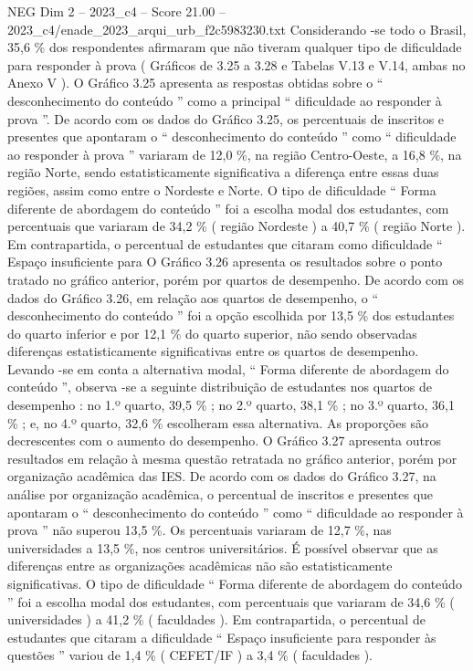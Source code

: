 \begin{textsample}{NEG Dim 2 – 2023\_c4 – Score 21.00 – 2023\_c4/enade\_2023\_arqui\_urb\_f2c5983230.txt}
Considerando -se todo o Brasil, 35,6 \% dos respondentes afirmaram que não tiveram qualquer tipo de dificuldade para responder à prova ( Gráficos de 3.25 a 3.28 e Tabelas V.13 e V.14, ambas no Anexo V ).
O Gráfico 3.25 apresenta as respostas obtidas sobre o “ desconhecimento do conteúdo ” como a principal “ dificuldade ao responder à prova ”.
De acordo com os dados do Gráfico 3.25, os percentuais de inscritos e presentes que apontaram o “ desconhecimento do conteúdo ” como “ dificuldade ao responder à prova ” variaram de 12,0 \%, na região Centro-Oeste, a 16,8 \%, na região Norte, sendo estatisticamente significativa a diferença entre essas duas regiões, assim como entre o Nordeste e Norte.
O tipo de dificuldade “ Forma diferente de abordagem do conteúdo ” foi a escolha modal dos estudantes, com percentuais que variaram de 34,2 \% ( região Nordeste ) a 40,7 \% ( região Norte ).
Em contrapartida, o percentual de estudantes que citaram como dificuldade “ Espaço insuficiente para O Gráfico 3.26 apresenta os resultados sobre o ponto tratado no gráfico anterior, porém por quartos de desempenho.
De acordo com os dados do Gráfico 3.26, em relação aos quartos de desempenho, o “ desconhecimento do conteúdo ” foi a opção escolhida por 13,5 \% dos estudantes do quarto inferior e por 12,1 \% do quarto superior, não sendo observadas diferenças estatisticamente significativas entre os quartos de desempenho.
Levando -se em conta a alternativa modal, “ Forma diferente de abordagem do conteúdo ”, observa -se a seguinte distribuição de estudantes nos quartos de desempenho : no 1.º quarto, 39,5 \% ; no 2.º quarto, 38,1 \% ; no 3.º quarto, 36,1 \% ; e, no 4.º quarto, 32,6 \% escolheram essa alternativa.
As proporções são decrescentes com o aumento do desempenho.
O Gráfico 3.27 apresenta outros resultados em relação à mesma questão retratada no gráfico anterior, porém por organização acadêmica das IES.
De acordo com os dados do Gráfico 3.27, na análise por organização acadêmica, o percentual de inscritos e presentes que apontaram o “ desconhecimento do conteúdo ” como “ dificuldade ao responder à prova ” não superou 13,5 \%.
Os percentuais variaram de 12,7 \%, nas universidades a 13,5 \%, nos centros universitários.
É possível observar que as diferenças entre as organizações acadêmicas não são estatisticamente significativas.
O tipo de dificuldade “ Forma diferente de abordagem do conteúdo ” foi a escolha modal dos estudantes, com percentuais que variaram de 34,6 \% ( universidades ) a 41,2 \% ( faculdades ).
Em contrapartida, o percentual de estudantes que citaram a dificuldade “ Espaço insuficiente para responder às questões ” variou de 1,4 \% ( CEFET/IF ) a 3,4 \% ( faculdades ).

\end{textsample}
